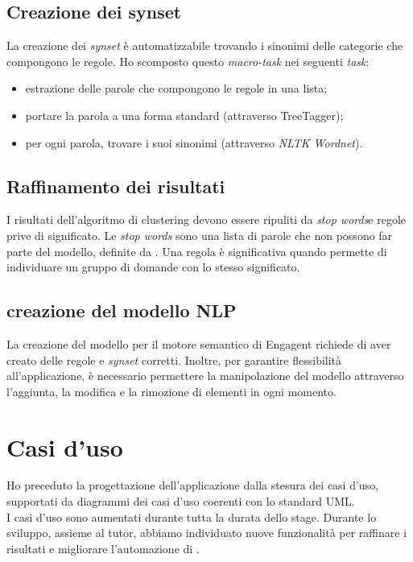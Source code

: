 \subsection*{Creazione dei synset}
La creazione dei \emph{synset} è automatizzabile trovando i sinonimi delle categorie che compongono le regole. Ho scomposto questo \textit{macro-task} nei seguenti \textit{task}:
\begin{itemize}
    \item estrazione delle parole che compongono le regole in una lista;
    \item portare la parola a una forma standard (attraverso TreeTagger);
    \item per ogni parola, trovare i suoi sinonimi (attraverso \textit{NLTK Wordnet}).
\end{itemize}

\subsection*{Raffinamento dei risultati}
I risultati dell'algoritmo di clustering devono essere ripuliti da \emph{stop words}\glsfirstoccur e regole prive di significato.
Le \textit{stop words} sono una lista di parole che non possono far parte del modello, definite da \company{}.
Una regola è significativa quando permette di individuare un gruppo di domande con lo stesso significato. 

\subsection*{creazione del modello NLP}
La creazione del modello per il motore semantico di Engagent richiede di aver creato delle regole e \emph{synset} corretti. Inoltre, per garantire flessibilità all'applicazione, è necessario permettere la manipolazione del modello attraverso l'aggiunta, la modifica e la rimozione di elementi in ogni momento.



\section{Casi d'uso}
Ho preceduto la progettazione dell'applicazione dalla stesura dei casi d'uso, supportati da diagrammi dei casi d'uso coerenti con lo standard UML.\\
I casi d'uso sono aumentati durante tutta la durata dello stage. Durante lo sviluppo, assieme al tutor, abbiamo individuato nuove funzionalità per raffinare i risultati e migliorare l'automazione di \app{}.

